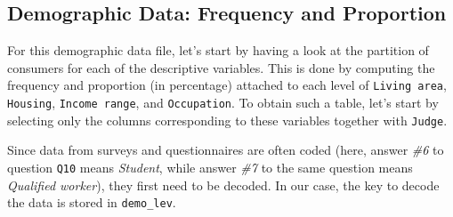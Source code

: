 \documentclass[
]{krantz}
\makeatletter
\newenvironment{Shaded}{\begin{snugshade}}{\end{snugshade}}
\newcommand{\AttributeTok}[1]{\textcolor[rgb]{0.61,0.61,0.61}{#1}}
\newcommand{\DecValTok}[1]{\textcolor[rgb]{0.06,0.06,0.06}{#1}}
\newcommand{\FunctionTok}[1]{\textcolor[rgb]{0,0,0}{#1}}
\newcommand{\NormalTok}[1]{#1}
\newcommand{\OtherTok}[1]{\textcolor[rgb]{0.37,0.37,0.37}{#1}}
\newcommand{\SpecialCharTok}[1]{\textcolor[rgb]{0,0,0}{#1}}
\newcommand{\StringTok}[1]{\textcolor[rgb]{0.5,0.5,0.5}{#1}}
\newenvironment{kframe}{%
\medskip{}
\setlength{\fboxsep}{.8em}
 \def\at@end@of@kframe{}%
 \ifinner\ifhmode%
  \def\at@end@of@kframe{\end{minipage}}%
  \begin{minipage}{\columnwidth}%
 \fi\fi%
 \def\FrameCommand##1{\hskip\@totalleftmargin \hskip-\fboxsep
 \colorbox{shadecolor}{##1}\hskip-\fboxsep
     \hskip-\linewidth \hskip-\@totalleftmargin \hskip\columnwidth}%
 \MakeFramed {\advance\hsize-\width
   \@totalleftmargin\z@ \linewidth\hsize
   \@setminipage}}%
 {\par\unskip\endMakeFramed%
 \at@end@of@kframe}
\renewenvironment{Shaded}{\begin{kframe}}{\end{kframe}}
\makeatother
\begin{document}
\begin{Shaded}
\end{Shaded}

\hypertarget{demographic-data-frequency-and-proportion}{%
\subsection{Demographic Data: Frequency and Proportion}\label{demographic-data-frequency-and-proportion}}

For this demographic data file, let's start by having a look at the partition of consumers for each of the descriptive variables. This is done by computing the frequency and proportion (in percentage) attached to each level of \texttt{Living\ area}, \texttt{Housing}, \texttt{Income\ range}, and \texttt{Occupation}. To obtain such a table, let's start by selecting only the columns corresponding to these variables together with \texttt{Judge}.

Since data from surveys and questionnaires are often coded (here, answer \emph{\#6} to question \texttt{Q10} means \emph{Student}, while answer \emph{\#7} to the same question means \emph{Qualified worker}), they first need to be decoded. In our case, the key to decode the data is stored in \texttt{demo\_lev}.
\end{document}
